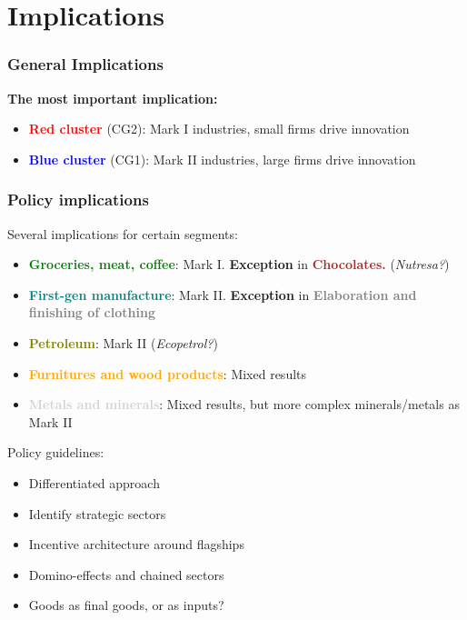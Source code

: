 \documentclass{beamer}
\begin{document}
\section{Implications}
	\begin{frame}
		\frametitle{General Implications}
		\textbf{The most important implication:}
		\begin{itemize}
			\item \textbf{\textcolor{red}{Red cluster}} (CG2): Mark I industries, small firms drive innovation
			\item \textbf{\textcolor{blue}{Blue cluster}} (CG1): Mark II industries, large firms drive innovation
		\end{itemize}
	\end{frame}
	\begin{frame}[allowframebreaks]
		\frametitle{Policy implications}
		Several implications for certain segments:
		\begin{itemize}
			\item \textbf{\textcolor{green}{Groceries, meat, coffee}}: Mark I. \textbf{Exception} in \textbf{\textcolor{brown}{Chocolates.}} (\textit{Nutresa?})
			\item \textbf{\textcolor{teal}{First-gen manufacture}}: Mark II. \textbf{Exception} in \textbf{\textcolor{gray}{Elaboration and finishing of clothing}}
			\item \textbf{\textcolor{olive}{Petroleum}}: Mark II (\textit{Ecopetrol?})
			\item \textbf{\textcolor{orange}{Furnitures and wood products}}: Mixed results
			\item \textbf{\textcolor{lightgray}{Metals and minerals}}: Mixed results, but more complex minerals/metals as Mark II
		\end{itemize}
		\framebreak
		Policy guidelines:
		\begin{itemize}
			\item Differentiated approach
			\item Identify strategic sectors
			\item Incentive architecture around flagships
			\item Domino-effects and chained sectors
			\item Goods as final goods, or as inputs?
		\end{itemize}
	\end{frame}
\end{document}
